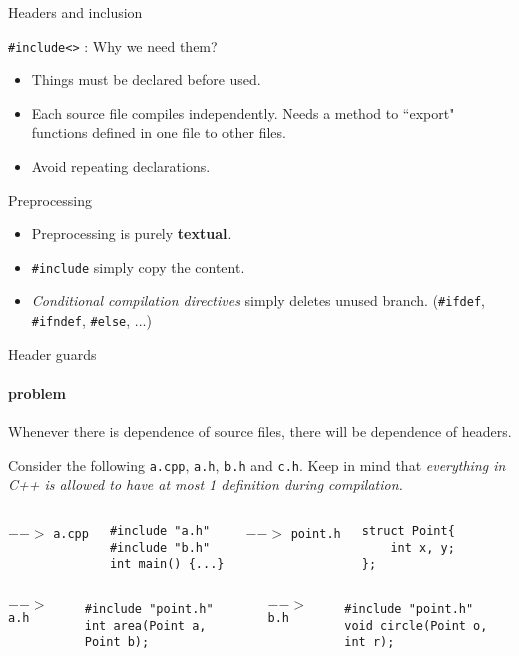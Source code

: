 \begin{frame}{Headers and inclusion}
\begin{block}{\texttt{\#include<>} : Why we need them?}
	\begin{itemize}
		\item Things must be declared before used.
		\item Each source file compiles independently. Needs a method to ``export" functions defined in one file to other files.
		\item Avoid repeating declarations. 
	\end{itemize}
\end{block}
\begin{block}{Preprocessing}
	\begin{itemize}
		\item Preprocessing is purely \textbf{textual}. 
		\item \texttt{\#include} simply copy the content.
		\item \textit{Conditional compilation directives }simply deletes unused branch. (\texttt{\#ifdef}, \texttt{\#ifndef}, \texttt{\#else}, ...)
	\end{itemize}
\end{block}

\end{frame}

\begin{frame}[fragile]{Header guards}
\framesubtitle{problem}
Whenever there is dependence of source files, there will be dependence of headers.

Consider the following \texttt{a.cpp}, \texttt{a.h}, \texttt{b.h} and \texttt{c.h}. Keep in mind that \textit{everything in C++ is allowed to have at most 1 definition during compilation.}

\begin{columns}
	$-->$ \texttt{a.cpp}
\begin{verbatim}
#include "a.h"
#include "b.h"
int main() {...}
\end{verbatim}
$-->$ \texttt{point.h}
\begin{verbatim}
struct Point{
    int x, y;
};
\end{verbatim}
\end{columns}
\vspace{0.2in}
\begin{columns}
	$-->$ \texttt{a.h}
\begin{verbatim}
#include "point.h"
int area(Point a, Point b);
\end{verbatim}
$-->$ \texttt{b.h}
\begin{verbatim}
#include "point.h"
void circle(Point o, int r);
\end{verbatim}
\end{columns}
\end{frame}

